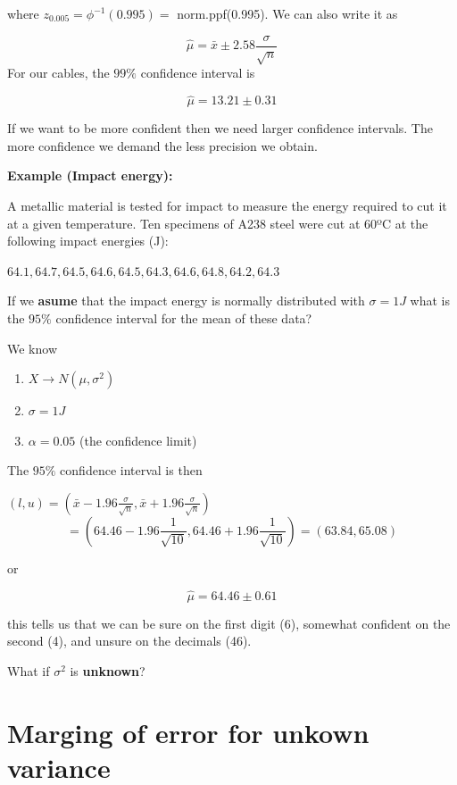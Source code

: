 \documentclass[
]{book}
\providecommand{\tightlist}{%
  \setlength{\itemsep}{0pt}\setlength{\parskip}{0pt}}
\begin{document}
where \(z_{0.005}=\phi^{-1}(0.995)=\) norm.ppf(0.995). We can also write it as

\[\hat{\mu}=\bar{x} \pm 2.58\frac{\sigma}{\sqrt{n}}\]
For our cables, the \(99\%\) confidence interval is

\[\hat{\mu}= 13.21 \pm 0.31\]

If we want to be more confident then we need larger confidence intervals. The more confidence we demand the less precision we obtain.

\textbf{Example (Impact energy):}

A metallic material is tested for impact to measure the energy required to cut it at a given temperature. Ten specimens of A238 steel were cut at 60ºC at the following impact energies (J):

\(64.1, 64.7, 64.5, 64.6, 64.5, 64.3, 64.6, 64.8, 64.2, 64.3\)

If we \textbf{asume} that the impact energy is normally distributed with \(\sigma=1J\) what is the \(95\%\) confidence interval for the mean of these data?

We know

\begin{enumerate}
\def\labelenumi{\arabic{enumi}.}
\tightlist
\item
  \(X \rightarrow N(\mu, \sigma^2)\)
\item
  \(\sigma=1J\)
\item
  \(\alpha=0.05\) (the confidence limit)
\end{enumerate}

The \(95\%\) confidence interval is then

\((l,u)=(\bar{x}-1.96 \frac{\sigma}{\sqrt{n}}, \bar{x}+1.96 \frac{\sigma}{\sqrt{n}})\)
\[=(64.46-1.96 \frac{1}{\sqrt{10}}, 64.46+1.96  \frac{1}{\sqrt{10}})=(63.84,65.08)\]

or

\[\hat{\mu}=64.46 \pm 0.61\]

this tells us that we can be sure on the first digit (6), somewhat confident on the second (4), and unsure on the decimals (46).

What if \(\sigma^2\) is \textbf{unknown}?

\hypertarget{marging-of-error-for-unkown-variance}{%
\section{Marging of error for unkown variance}\label{marging-of-error-for-unkown-variance}}
\end{document}
